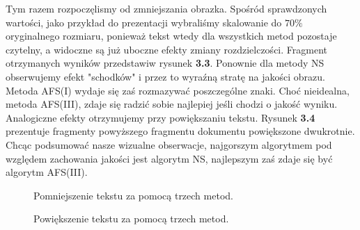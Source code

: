 Tym razem rozpoczęlismy od zmniejszania obrazka. Spośród sprawdzonych wartości,
jako przykład do prezentacji wybraliśmy skalowanie do $70\%$ oryginalnego
rozmiaru, ponieważ tekst wtedy dla wszystkich metod pozostaje czytelny, a
widoczne są już uboczne efekty zmiany rozdzielczości. Fragment otrzymanych
wyników przedstawiw rysunek \textbf{3.3}. Ponownie dla metody NS obserwujemy
efekt "schodków" i przez to wyraźną stratę na jakości obrazu. Metoda AFS(I)
wydaje się zaś rozmazywać poszczególne znaki. Choć nieidealna, metoda AFS(III),
zdaje się radzić sobie najlepiej jeśli chodzi o jakość wyniku. Analogiczne efekty
otrzymujemy przy powiększaniu tekstu. Rysunek \textbf{3.4} prezentuje
fragmenty powyższego fragmentu dokumentu powiększone dwukrotnie. Chcąc
podsumować nasze wizualne obserwacje, najgorszym algorytmem pod względem zachowania
jakości jest algorytm NS, najlepszym zaś zdaje się być algorytm AFS(III).
\begin{figure}[h!tb]
\begin{center}
\caption{Pomniejszenie tekstu za pomocą trzech metod.}
\end{center}
\end{figure}
\begin{figure}
\begin{center}
\caption{Powiększenie tekstu za pomocą trzech metod.}
\end{center}
\end{figure}

